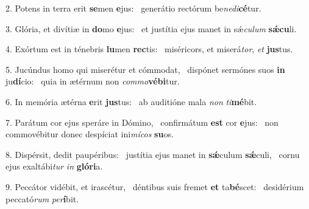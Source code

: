 2. Potens in terra erit \textbf{se}men \textbf{e}jus: \ast\  generátio rectórum be\textit{ne}\textit{di}\textbf{cé}tur.\

3. Glória, et divítiæ in \textbf{do}mo \textbf{e}jus: \ast\  et justítia ejus manet in sǽ\textit{cu}\textit{lum} \textbf{sǽ}\textbf{cu}li.\

4. Exórtum est in ténebris \textbf{lu}men \textbf{rec}tis: \ast\  miséricors, et miserá\textit{tor}, \textit{et} \textbf{jus}tus.\

5. Jucúndus homo qui miserétur et cómmodat, \dag\  dispónet sermónes suos \textbf{in} ju\textbf{dí}cio: \ast\  quia in ætérnum non \textit{com}\textit{mo}\textbf{vé}\textbf{bi}tur.\

6. In memória ætérna \textbf{e}rit \textbf{jus}tus: \ast\  ab auditióne mala \textit{non} \textit{ti}\textbf{mé}bit.\

7. Parátum cor ejus speráre in Dómino, \dag\  confirmátum \textbf{est} cor \textbf{e}jus: \ast\  non commovébitur donec despíciat ini\textit{mí}\textit{cos} \textbf{su}os.\

8. Dispérsit, dedit paupéribus: \dag\  justítia ejus manet in \textbf{sǽ}culum \textbf{sǽ}culi, \ast\  cornu ejus exaltábi\textit{tur} \textit{in} \textbf{gló}\textbf{ri}a.\

9. Peccátor vidébit, et irascétur, \dag\  déntibus suis fremet \textbf{et} ta\textbf{bé}scet: \ast\  desidérium peccató\textit{rum} \textit{per}\textbf{í}bit.\

